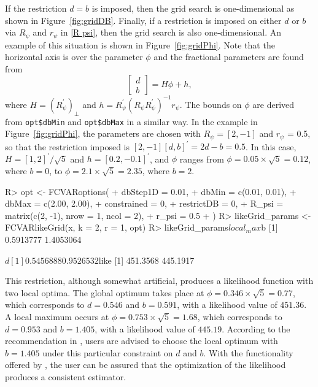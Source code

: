 \documentclass[article]{jss}
\newcommand{\fct}[1]{\code{#1()}}
\begin{document}
If the restriction $d=b$ is imposed, then the grid search is one-dimensional as shown in Figure~\ref{fig:gridDB}. Finally, if a restriction is imposed on either $d$ or $b$ via $R_\psi$ and $r_\psi$ in \eqref{R psi}, then the grid search is also one-dimensional. An example of this situation is shown in Figure~\ref{fig:gridPhi}. Note that the horizontal axis is over the parameter $\phi$ and the fractional parameters are found from
\begin{equation}
  \begin{bmatrix}
    d \\ b
  \end{bmatrix}
  = H\phi + h,
\end{equation}
where $H = (R_{\psi}^{\prime})_\perp$ and $h = R_{\psi}^{\prime} (R_\psi R_{\psi}^{\prime})^{-1} r_\psi$. The bounds on $\phi$ are derived from \verb|opt$dbMin| and \verb|opt$dbMax| in a similar way.
% 
In the example in Figure~\ref{fig:gridPhi}, 
the parameters are chosen with $R_{\psi} = [2, -1]$ and $r_\psi$ = 0.5, 
so that the restriction imposed is $[2, -1] [d, b]^{\prime} = 2d - b = 0.5$.
In this case, $H = [1, 2]^{\prime}/\sqrt{5}$ and $h = [0.2, -0.1]^{\prime}$, 
and $\phi$ ranges from $\phi = 0.05\times\sqrt{5} = 0.12$, where $b = 0$, 
to $\phi = 2.1\times\sqrt{5} = 2.35$, where $b = 2$. 
% 

\begin{Code}
R> opt <- FCVARoptions(
  +         dbStep1D     = 0.01, 
  +         dbMin        = c(0.01, 0.01), 
  +         dbMax        = c(2.00, 2.00), 
  +         constrained  = 0, 
  +         restrictDB   = 0, 
  +         R_psi        = matrix(c(2, -1), nrow = 1, ncol = 2),
  +         r_psi        = 0.5
  + )
R> likeGrid_params <- FCVARlikeGrid(x, k = 2, r = 1, opt)
R> likeGrid_params$local_max
 $b
 [1] 0.5913777 1.4053064

 $d
 [1] 0.5456888 0.9526532

 $like
 [1] 451.3568 445.1917
\end{Code}


This restriction, although somewhat artificial, produces a likelihood function with two local optima. 
The global optimum takes place at $\phi = 0.346\times\sqrt{5} = 0.77$, 
which corresponds to $d = 0.546$ and $b = 0.591$, 
with a likelihood value of $451.36$.
A local maximum occurs at $\phi = 0.753\times\sqrt{5} = 1.68$, 
which corresponds to $d = 0.953$ and $b = 1.405$, 
with a likelihood value of $445.19$. 
According to the recommendation in \cite{Carlini2014}, 
users are advised to choose the local optimum with $b = 1.405$ under this particular constraint on $d$ and $b$. 
With the functionality offered by \fct{FCVARlikeGrid}, 
the user can be assured that the optimization of the likelihood produces a consistent estimator.  
\end{document}
